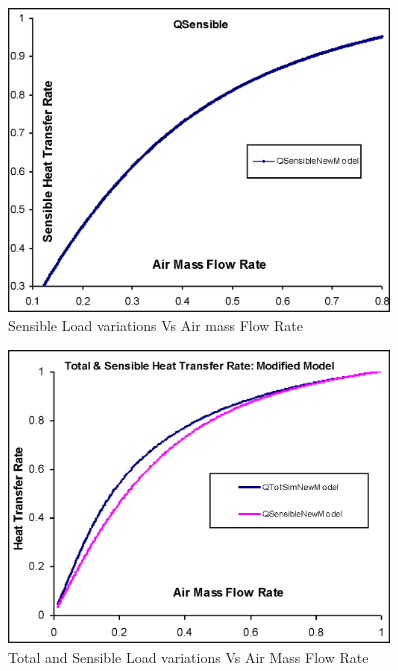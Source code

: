 \begin{figure}[hbtp] %
\centering
\includegraphics[width=0.9\textwidth, height=0.9\textheight, keepaspectratio=true]{media/image3349.png}
\caption{Sensible Load variations Vs Air mass Flow Rate \protect \label{fig:sensible-load-variations-vs-air-mass-flow}}
\end{figure}

\begin{figure}[hbtp] %
\centering
\includegraphics[width=0.9\textwidth, height=0.9\textheight, keepaspectratio=true]{media/image3350.png}
\caption{Total and Sensible Load variations Vs Air Mass Flow Rate \protect \label{fig:total-and-sensible-load-variations-vs-air}}
\end{figure}

